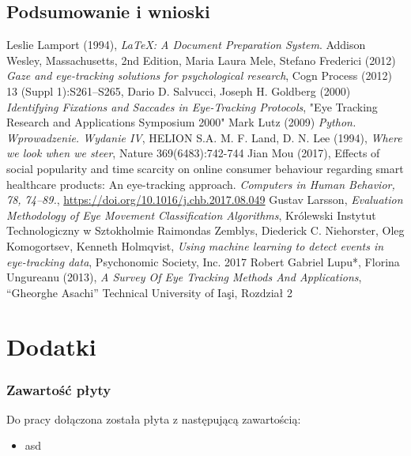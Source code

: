 \documentclass[14pt,a4paper,twoside,openright,titlepage]{extbook}
\begin{document}
    \chapter{Podsumowanie i wnioski}
        \blindtext
    \backmatter
    \fancyhf{}
    \pagestyle{plain}
    \renewcommand{\headrulewidth}{0pt}
    \begin{thebibliography}{99}
            Leslie Lamport (1994),
            \emph{\LaTeX: A Document Preparation System}.
            Addison Wesley, Massachusetts,
            2nd Edition,
            Maria Laura Mele, Stefano Frederici (2012)
            \emph{Gaze and eye-tracking solutions for psychological research},
            Cogn Process (2012) 13 (Suppl 1):S261–S265,
            Dario D. Salvucci, Joseph H. Goldberg (2000)
            \emph{Identifying Fixations and Saccades in Eye-Tracking Protocols},
            "Eye Tracking Research and Applications Symposium 2000"
            Mark Lutz (2009)
            \emph{Python. Wprowadzenie. Wydanie IV},
            HELION S.A.
            M. F. Land, D. N. Lee (1994),
            \emph{Where we look when we steer},
            Nature 369(6483):742-744
            Jian Mou (2017),
            Effects of social popularity and time scarcity on online consumer behaviour regarding smart healthcare products: An eye-tracking approach. \emph{Computers in Human Behavior, 78, 74–89.},
            \url{https://doi.org/10.1016/j.chb.2017.08.049}
            Gustav Larsson,
            \emph{Evaluation Methodology of Eye
            Movement Classification Algorithms},
            Królewski Instytut Technologiczny w Sztokholmie
            Raimondas Zemblys, Diederick C. Niehorster, Oleg Komogortsev, Kenneth Holmqvist,
            \emph{Using machine learning to detect events in eye-tracking data},
            Psychonomic Society, Inc. 2017
            Robert Gabriel Lupu*, Florina Ungureanu (2013),
            \emph{A Survey Of Eye Tracking Methods And Applications},
            “Gheorghe Asachi” Technical University of Iaşi,
            Rozdział 2
    \end{thebibliography}
    \part*{Dodatki}
        \section*{Zawartość płyty}
            Do pracy dołączona została płyta z następującą zawartością:
            \begin{itemize}
                \item asd
            \end{itemize}
        \listoffigures
        \listoftables
\end{document}
